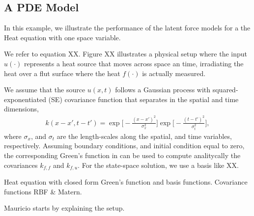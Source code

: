 \documentclass[journal]{IEEEtran}
\newcommand{\simo}[1]{{\color{red}#1}}
\begin{document}





\subsection{A PDE Model}
In this example, we illustrate the performance of the latent force
models for a the Heat equation with one space variable. 

We refer to equation  XX. Figure XX illustrates a physical setup where
the input  $u(\cdot)$ represents a heat source that moves across space
an time, irradiating the heat over a flut surface where the heat $f(\cdot)$ is
actually measured.


We assume that the source $u(x, t)$ follows a Gaussian process with
squared-exponentiated (SE) covariance
function that separates in the spatial and time dimensions,
\begin{align*}
k(x-x', t -t') = \exp\Bigg[-\frac{(x-x')^2}{\sigma^2_x}\Bigg]\exp\Bigg[-\frac{(t-t')^2}{\sigma^2_t}\Bigg],
\end{align*}
where $\sigma_x$, and $\sigma_t$ are the length-scales along the
spatial, and time variables, respectively. 
Assuming boundary conditions, and initial condition equal to zero, the
corresponding Green's function in \cite{Polyanin:Handbook02} can be
used to compute analitycally the covariances  $k_{f,f}$ and $k_{f,u}$.
% 
For the state-space solution, we use a basis like XX. 


%
\simo{Heat equation with closed form Green's function and basis functions. Covariance functions RBF \& Matern.}

\simo{Mauricio starts by explaining the setup.}
\end{document}
